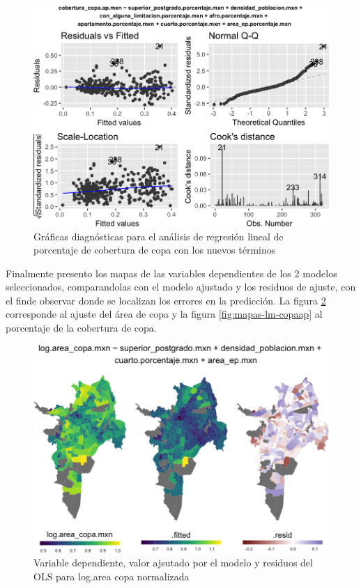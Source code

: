 \documentclass[12pt,]{book}
\begin{document}
\begin{figure}
\includegraphics[width=1\linewidth]{tesis-unigis_files/figure-latex/diagn-mod-best-lm-copaap-1} \caption{Gráficas diagnósticas para el análisis de regresión lineal de porcentaje de cobertura de copa con los nuevos términos}\label{fig:diagn-mod-best-lm-copaap}
\end{figure}

Finalmente presento los mapas de las variables dependientes de los 2
modelos seleccionados, comparandolas con el modelo ajustado y los
residuos de ajuste, con el finde observar donde se localizan los errores
en la predicción. La figura \ref{fig:mapas-lm-copa} corresponde al
ajuste del área de copa y la figura \ref{fig:mapas-lm-copaap} al
porcentaje de la cobertura de copa.

\begin{figure}
\includegraphics[width=1\linewidth]{tesis-unigis_files/figure-latex/mapas-lm-copa-1} \caption{Variable dependiente, valor ajsutado por el modelo y residuos del OLS para log.area copa normalizada}\label{fig:mapas-lm-copa}
\end{figure}
\end{document}
